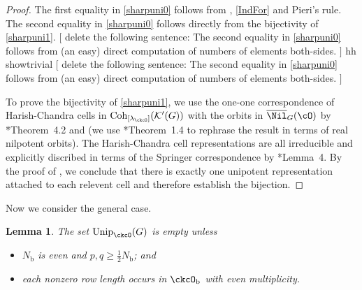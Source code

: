 \documentclass[12pt,a4paper]{amsart}
\newcommand{\trivial}[2][]{\if\relax\detokenize{#1}\relax
  {%
      \color{orange} \vspace{0em} $[$  #2 $]$
      \color{black}
  }
  \else
\ifx#1h
\ifcsname showtrivial\endcsname
{%
    \color{orange} \vspace{0em}  $[$ #2 $]$
    \color{black}
}
\fi
\else {\red Wrong argument!} \fi
\fi
}
\newcommand{\CK}{{\mathcal {K}}}
\newcommand{\oU}{\operatorname{U}}
\numberwithin{equation}{section}
\newtheorem{lem}[thm]{Lemma}
\theoremstyle{remark}
\def\half{{\tfrac{1}{2}}}
\def\Unip{\mathrm{Unip}}
\def\Cint#1{\Coh_{[#1]}}
\def\nbb{n_{\mathrm b}}
\def\Coh{\mathrm{Coh}}
\def\ckcOb{\ckcO_{\mathrm b}}
\def\Gg{G_{\mathrm g}}
\newcommand{\Lam}{{[\lambda]}}
\begin{document}
\begin{proof} The first equality  in \eqref{sharpuni0} follows from ,
  \eqref{IndFor} and Pieri's rule.
  The second equality in \eqref{sharpuni0} follows directly from
  the bijectivity of \eqref{sharpuni1}.
  \trivial[h]{
  {delete the following sentence: }
  The second equality in \eqref{sharpuni0}
  follows from (an easy) direct computation of numbers of elements both-sides.
  }
 To prove the bijectivity of \eqref{sharpuni1}, we use the one-one
  correspondence of Harish-Chandra cells in $\Cint{\lambda_\ckcO}(\CK'(G))$ with
  the orbits in $\overline \Nil_{G}(\cO)$ by \cite{BV.W}*{Theorem~4.2} and
  \cite[Theorem 5]{Bo} (we use \cite{SV}*{Theorem~1.4} to rephrase the result in
  terms of real nilpotent orbits).
  The Harish-Chandra cell representations are all irreducible and explicitly
  discribed in terms of the Springer correspondence by \cite{Bo}*{Lemma~4}.
  By the proof of , we conclude that
  there is exactly one unipotent representation attached to each
  relevent cell and therefore establish the bijection.
\end{proof}





Now we consider the general case.

\begin{lem} \label{propu0}
The set $\Unip_{\ckcO}(G)$ is empty  unless           \begin{itemize}
            \item $N_{\mathrm b}$ is even and $p,q \geq \half N_{\mathrm b}$; and
            \item each nonzero row length occurs in $\ckcOb$ with even multiplicity.
          \end{itemize}
\end{lem}
\end{document}
